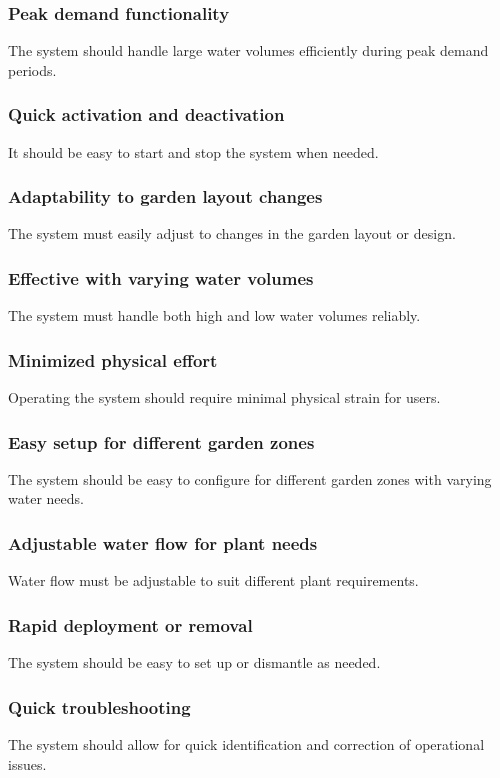 \documentclass[11pt]{article}
\begin{document}
\subsubsection{Peak demand functionality}
The system should handle large water volumes efficiently during peak demand periods.

\subsubsection{Quick activation and deactivation}
It should be easy to start and stop the system when needed.

\subsubsection{Adaptability to garden layout changes}
The system must easily adjust to changes in the garden layout or design.

\subsubsection{Effective with varying water volumes}
The system must handle both high and low water volumes reliably.

\subsubsection{Minimized physical effort}
Operating the system should require minimal physical strain for users.

\subsubsection{Easy setup for different garden zones}
The system should be easy to configure for different garden zones with varying water needs.

\subsubsection{Adjustable water flow for plant needs}
Water flow must be adjustable to suit different plant requirements.

\subsubsection{Rapid deployment or removal}
The system should be easy to set up or dismantle as needed.

\subsubsection{Quick troubleshooting}
The system should allow for quick identification and correction of operational issues.
\end{document}
